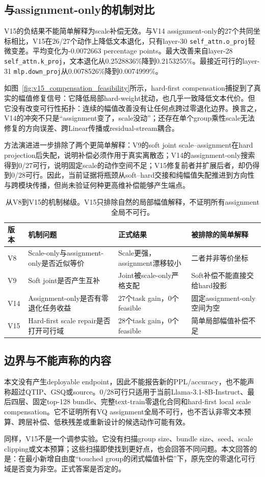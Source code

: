 \subsection{与assignment-only的机制对比}

V15的负结果不能简单解释为scale补偿无效。与V14 assignment-only的27个共同坐标相比，V15在26/27个动作上降低文本退化，只有layer-30 \texttt{self\_attn.o\_proj}轻微变差。平均变化为-0.0072663 percentage points。最大改善来自layer-28 \texttt{self\_attn.k\_proj}，文本退化从0.2528836\%降到0.2153255\%。最接近可行的layer-31 \texttt{mlp.down\_proj}从0.0078526\%降到0.0074999\%。

如图~\ref{fig:v15_compensation_feasibility}所示，hard-first compensation捕捉到了真实的幅值修复信号：它降低局部hard-weight扰动，也几乎一致降低文本代价。但它没有改变可行性拓扑：连续的幅值改善没有让任何点跨过零退化边界。换言之，V14的冲突不只是“assignment变了，scale没动”；还存在单个group乘性scale无法修复的方向误差、跨Linear传播或residual-stream耦合。

方法演进进一步排除了两个更简单解释：V9的soft joint scale--assignment在hard projection后失配，说明补偿必须作用于真实离散态；V14的assignment-only搜索得到0/27可行，说明固定scale的动作空间不足；V15修复前者并扩展后者，却仍得到0/28可行。因此，当前证据将瓶颈从soft--hard交接和纯幅值失配推进到方向性与跨模块传播，但尚未验证何种更高维补偿能够产生端点。

\begin{table}[t]
\centering
\small
\caption{从V8到V15的机制梯级。V15只排除自然的局部幅值解释，不证明所有assignment全局不可行。}
\begin{tabular}{llll}
\toprule
版本 & 机制问题 & 正式结果 & 被排除的简单解释\\
\midrule
V8 & Scale-only与assignment-only是否近似等价 & Scale更强，assignment漂移较小 & 二者并非等价坐标\\
V9 & Soft joint是否产生互补 & Joint被scale-only严格支配 & Soft补偿不能直接交给hard投影\\
V14 & Assignment-only是否有零退化任务收益 & 27个task gain，0个feasible & 固定assignment-only空间为空\\
V15 & Hard-first scale repair是否打开可行域 & 28个task gain，0个feasible & 简单局部幅值补偿不足\\
\bottomrule
\end{tabular}
\end{table}

\subsection{边界与不能声称的内容}

本文没有产生deployable endpoint，因此不能报告新的PPL/accuracy，也不能声称超过QTIP、GSQ或source。0/28可行只适用于当前Llama-3.1-8B-Instruct、最后四层、固定top-128 bundle、完整text-train零退化合同和hard-first local scale compensation。它不证明所有VQ assignment全局不可行，也不否认非零文本预算、跨层补偿、低秩残差或重新设计的候选动作可能有效。

同样，V15不是一个调参实验。它没有扫描group size、bundle size、seed、scale clipping或文本预算；这些扫描即使找到更好点，也会回答不同问题。本文回答的是：在最小新增自由度“touched group的闭式幅值补偿”下，原先空的零退化可行域是否变为非空。正式答案是否定的。
